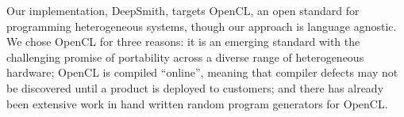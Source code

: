 Our implementation, DeepSmith, targets OpenCL, an open standard for programming heterogeneous systems, though our approach is language agnostic. We chose OpenCL for three reasons: it is an emerging standard with the challenging promise of portability across a diverse range of heterogeneous hardware; OpenCL is compiled ``online'', meaning that compiler defects may not be discovered until a product is deployed to customers; and there has already been extensive work in hand written random program generators for OpenCL. 


%
%
%
%
%
%
%
